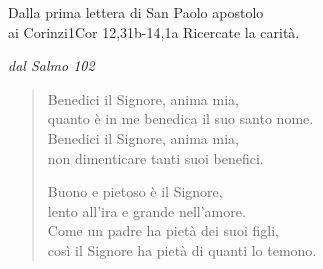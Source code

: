 \documentclass[11pt,a4paper]{book}
\renewcommand{\intestfont}[1]{{\Large\scshape\textcolor{SAGEcolor}{#1}}} %
\begin{document}
\begin{pages}
\begin{Leftside}
\begin{lettura}[]{Dalla prima lettera di San Paolo apostolo \\ai Corinzi}{1Cor 12,31b-14,1a}
        Ricercate la carità.\\
        \end{lettura}
  \pend 
  \pstart 
  \vspace{0.5in}
        \noindent\intestfont{Salmo responsoriale}\hfil {\small\itshape\textcolor{crosscolor}{dal Salmo 102}}
  \pend 
  \pstart
  \vspace{0.1in}
        \rispostasalmo
  \pend
  \pstart 
  \vspace{0.3in}
        \begin{verse}
            Benedici il Signore, anima mia,\\
            quanto è in me benedica il suo santo nome.\\
            Benedici il Signore, anima mia,\\
            non dimenticare tanti suoi benefici.\\
            \rispostasalmo

            Buono e pietoso è il Signore,\\
            lento all'ira e grande nell'amore.\\
            Come un padre ha pietà dei suoi figli,\\
            così il Signore ha pietà di quanti lo temono.\\
            \rispostasalmo


\end{verse}
\end{Leftside}
\end{pages}
\end{document}
